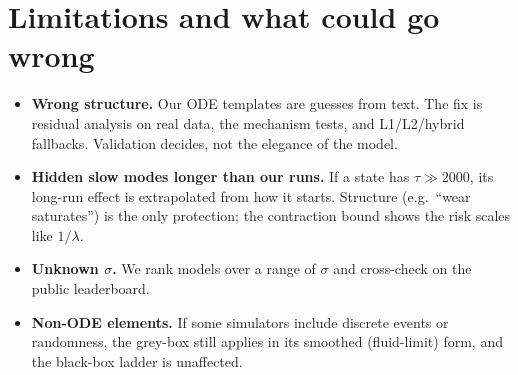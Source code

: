\documentclass[11pt]{article}
\theoremstyle{plain}
\theoremstyle{definition}
\theoremstyle{remark}
\begin{document}
\section{Limitations and what could go wrong}
\begin{itemize}
\item \textbf{Wrong structure.} Our ODE templates are guesses from text. The fix is residual analysis on real data, the mechanism tests, and L1/L2/hybrid fallbacks. Validation decides, not the elegance of the model.
\item \textbf{Hidden slow modes longer than our runs.} If a state has $\tau\gg2000$, its long-run effect is extrapolated from how it starts. Structure (e.g.\ ``wear saturates'') is the only protection; the contraction bound shows the risk scales like $1/\lambda$.
\item \textbf{Unknown $\sigma$.} We rank models over a range of $\sigma$ and cross-check on the public leaderboard.
\item \textbf{Non-ODE elements.} If some simulators include discrete events or randomness, the grey-box still applies in its smoothed (fluid-limit) form, and the black-box ladder is unaffected.
\end{itemize}
\end{document}
